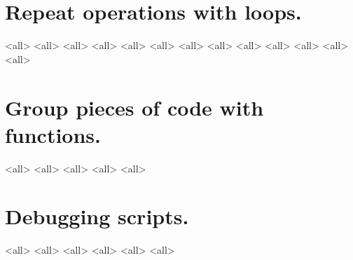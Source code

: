 \section{Repeat operations with loops.}
\mode<all>{}
\mode<all>{}
\mode<all>{}
\mode<all>{}
\mode<all>{}
\mode<all>{}
\mode<all>{}
\mode<all>{}
\mode<all>{}
\mode<all>{}
\mode<all>{}
\mode<all>{}
\mode<all>{}
%
\section{Group pieces of code with functions.}
\mode<all>{}
\mode<all>{}
\mode<all>{}
\mode<all>{}
\mode<all>{}

\section{Debugging scripts.}
\mode<all>{}
\mode<all>{}
\mode<all>{}
\mode<all>{}
\mode<all>{}
\mode<all>{}


